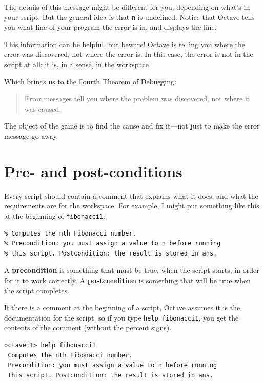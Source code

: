 \documentclass{book}
\begin{document}
The details of this message might be different for you, depending
on what's in your script. But the general idea is that {\tt n}
is undefined. Notice that Octave tells you what line of your
program the error is in, and displays the line.

This information can be helpful, but beware! Octave is telling you
where the error was discovered, not where the error is. In this
case, the error is not in the script at all; it is, in a sense, in
the workspace.

Which brings us to the Fourth Theorem of Debugging:

\begin{quote}
Error messages tell you where the problem was discovered, not
where it was caused. 
\end{quote}

The object of the game is to find the cause and
fix it---not just to make the error message go away.


\section{Pre- and post-conditions}

Every script should contain a comment that explains
what it does, and what the requirements are for the workspace. For
example, I might put something like this at the beginning of
{\tt fibonacci1}:

\begin{verbatim}
% Computes the nth Fibonacci number. 
% Precondition: you must assign a value to n before running 
% this script. Postcondition: the result is stored in ans.
\end{verbatim}

A {\bf precondition} is something that must be true, when the script
starts, in order for it to work correctly. A {\bf postcondition}
is something that will be true when the script completes.

If there is a comment at the beginning of a script, Octave assumes
it is the documentation for the script, so if you type {\tt help
fibonacci1}, you get the contents of the comment (without the percent
signs).

\begin{verbatim}
octave:1> help fibonacci1
 Computes the nth Fibonacci number. 
 Precondition: you must assign a value to n before running 
 this script. Postcondition: the result is stored in ans.
\end{verbatim}
\end{document}
